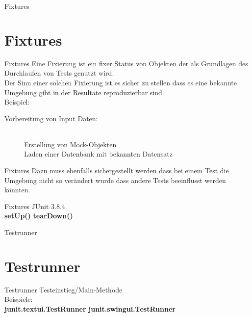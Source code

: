 \documentclass[10pt]{beamer}
\begin{document}
\begin{frame}[fragile]{Fixtures}
    \section{Fixtures}
\end{frame}

\begin{frame}[fragile]{Fixtures}
    Eine Fixierung ist ein fixer Status von Objekten der als Grundlagen des Durchlaufen von Tests genutzt wird. \\
    Der Sinn einer solchen Fixierung ist es sicher zu stellen dass es eine bekannte Umgebung gibt in der Resultate reproduzierbar sind. \\
    Beispiel:
    \begin{description}
    \item[Vorbereitung von Input Daten:]\hfill \\
        Erstellung von Mock-Objekten\\
        Laden einer Datenbank mit bekannten Datensatz
    \end{description}
\end{frame}

\begin{frame}[fragile]{Fixtures}
    Dazu muss ebenfalls sichergestellt werden dass bei einem Test die Umgebung nicht so verändert wurde dass andere Tests beeinflusst werden könnten.
\end{frame}

\begin{frame}[fragile]{Fixtures}
    JUnit 3.8.4\\
    \textcolor{mygreen}{\textbf{setUp()}} \newline
    \textcolor{mygreen}{\textbf{tearDown()}}
\end{frame}

\begin{frame}[fragile]{Testrunner}
    \section{Testrunner}
\end{frame}

\begin{frame}[fragile]{Testrunner}
    Testeinstieg/Main-Methode\\
    Beispiele:\\
    \textcolor{mygreen}{\textbf{junit.textui.TestRunner}} \newline
    \textcolor{mygreen}{\textbf{junit.swingui.TestRunner}}
\end{frame}
\end{document}
